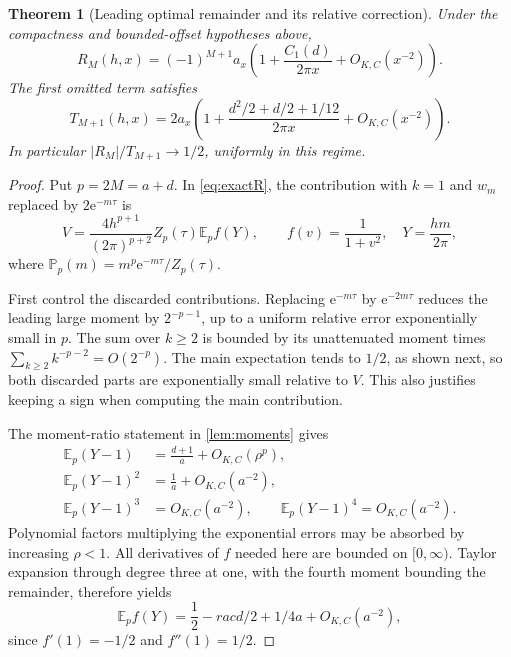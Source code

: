 \documentclass[11pt,a4paper]{article}
\newcommand{\ee}{\mathrm e}
\numberwithin{equation}{section}
\theoremstyle{plain}
\newtheorem{theorem}{Theorem}[section]
\theoremstyle{definition}
\theoremstyle{remark}
\begin{document}
\begin{theorem}[Leading optimal remainder and its relative correction]
\label{thm:optimal}
Under the compactness and bounded-offset hypotheses above,
\begin{equation}
 \boxed{R_M(h,x)=(-1)^{M+1}a_x
       \left(1+\frac{C_1(d)}{2\pi x}+O_{K,C}(x^{-2})\right).}
 \label{eq:optimal}
\end{equation}
The first omitted term satisfies
\begin{equation}
 T_{M+1}(h,x)=2a_x
 \left(1+\frac{d^2/2+d/2+1/12}{2\pi x}
                         +O_{K,C}(x^{-2})\right).
 \label{eq:optimalT}
\end{equation}
In particular $|R_M|/T_{M+1}\to1/2$, uniformly in this regime.
\end{theorem}
\begin{proof}
Put $p=2M=a+d$. In \eqref{eq:exactR}, the contribution with $k=1$ and
$w_m$ replaced by $2\ee^{-m\tau}$ is
\begin{equation}
 V=\frac{4h^{p+1}}{(2\pi)^{p+2}}Z_p(\tau)
     \mathbb E_p f(Y),\qquad
 f(v)=\frac1{1+v^2},\quad Y=\frac{hm}{2\pi},
 \label{eq:V}
\end{equation}
where $\mathbb P_p(m)=m^p\ee^{-m\tau}/Z_p(\tau)$.

First control the discarded contributions. Replacing $\ee^{-m\tau}$ by
$\ee^{-2m\tau}$ reduces the leading large moment by $2^{-p-1}$, up to a
uniform relative error exponentially small in $p$. The sum over $k\ge2$ is
bounded by its unattenuated moment times
$\sum_{k\ge2}k^{-p-2}=O(2^{-p})$. The main expectation tends to $1/2$, as
shown next, so both discarded parts are exponentially small relative to $V$.
This also justifies keeping a sign when computing the main contribution.

The moment-ratio statement in \cref{lem:moments} gives
\begin{align*}
 \mathbb E_p(Y-1)&=\frac{d+1}{a}+O_{K,C}(\rho^p),\\
 \mathbb E_p(Y-1)^2&=\frac1a+O_{K,C}(a^{-2}),\\
 \mathbb E_p(Y-1)^3&=O_{K,C}(a^{-2}),\qquad
 \mathbb E_p(Y-1)^4=O_{K,C}(a^{-2}).
\end{align*}
Polynomial factors multiplying the exponential errors may be absorbed by
increasing $\rho<1$. All derivatives of $f$ needed here are bounded on
$[0,\infty)$. Taylor expansion through degree three at one, with the fourth
moment bounding the remainder, therefore yields
\begin{equation}
 \mathbb E_p f(Y)=\frac12-
rac{d/2+1/4}{a}
                         +O_{K,C}(a^{-2}),
 \label{eq:Ef}
\end{equation}
since $f'(1)=-1/2$ and $f''(1)=1/2$.


\end{proof}
\end{document}
